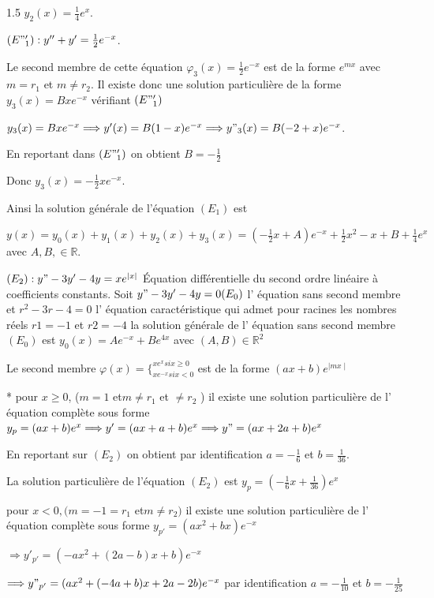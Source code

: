 \documentclass[12pt]{article}
\begin{document}
\begin{spacing}{1.5}
$y_2(x)=\frac{1}{4}e^x$.

\medskip $(E"'_1): y^{\prime\prime}+y^{\prime}=\frac{1}{2}e^{-x}$.

Le second membre de cette équation $\varphi_3(x)=\frac{1}{2}e^{-x}$ est de la forme $e^{mx}$ avec $m=r_1$ et $m\neq r_2$. Il existe donc une solution particulière de la forme $y_3(x)=Bxe^{-x}$ vérifiant $(E"'_1)$

$y_3(x)=Bxe^{-x}\Longrightarrow y^{\prime}(x)=B(1-x)e^{-x}\Longrightarrow y"_3(x)=B(-2+x)e^{-x}$.

En reportant dans $(E"'_1)$ on obtient $B=-\frac{1}{2}$

  Donc $y_3(x)=-\frac{1}{2}xe^{-x}$.
  
 Ainsi la solution générale de l'équation $(E_1)$ est 

$
y(x)=y_0(x)+y_1(x)+y_2(x)+y_3(x)=(-\frac{1}{2}x+A)e^{-x}+\frac{1}{2}x^2-x+B+\frac{1}{4}e^x
$
 avec $A,B, \in \mathbb{R}$.

\medskip$(E_2): y"-3y'-4y = xe^{\mid x\mid}$
Équation différentielle du second ordre linéaire à coefficients constants.
Soit $y"-3y'-4y = 0 (E_0)$ l' équation sans second membre et $r^2-3r-4 = 0$ l' équation caractéristique qui admet pour racines les nombres réels $r1 = -1$ et $r2 = -4$
la solution générale de l' équation sans second membre $(E_0 )$ est
$y_0(x) = Ae^{-x} + Be^{4x}$ avec $(A,B )\in \mathbb{R}^2$

Le second membre $\varphi(x) =\lbrace_{xe^{-x} si x < 0}^{xe^x si x \geq 0}$ est de la forme $(ax+b)e^{\mid mx\mid}$

* pour $ x \geq 0$, ($m = 1$ et$m \neq r_1$ et $\neq r_2$ )
il existe une solution particulière de l' équation complète sous forme
$y_p = (ax + b)e^x
\Longrightarrow y' = (ax + a + b)e^x
\Longrightarrow y"=(ax + 2a + b)e^x$

En reportant sur $(E_2)$ on obtient par identification $a=-\frac{1}{6}$ et $b=\frac{1}{36}$.

La solution particulière de l'équation  $(E_2)$ est $y_p = (-\frac{1}{6}x + \frac{1}{36})e^x$

\vspace{1cm}
pour $x < 0, (m = -1 = r_1$ et$ m \neq r_2 )$ il existe une solution particulière de l' équation complète sous forme $y_{p'} = (ax^2 + bx)e^{-x}$

$\Longrightarrow y'_{p'} = (-ax^2 + (2a - b)x + b)e^{-x}$

$\Longrightarrow y"_{p'}=(ax^2 + (-4a + b)x + 2a -2b)e^{-x}$
par identification $a = -\frac{1}{10}$
et $ b= -\frac{1}{25}$


\end{spacing}
\end{document}
